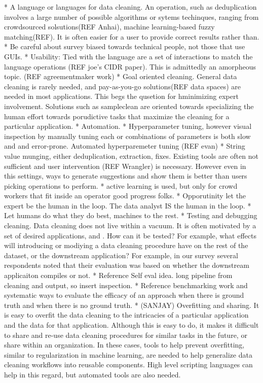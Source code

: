 * A language or languages for data cleaning.  An operation, such as deduplication involves a large number of possible algorithms or sytems techinques, ranging from crowdsourced solsutions(REF Anhai), machine learning-based fuzzy matching(REF).  It is often easier for a user to provide correct results rather than.
* Be careful about survey biased towards technical people, not those that use GUIs. 
* Usability: Tied with the language are a set of interactions to match the language operations (REF joe’s CIDR paper).  This is admittedly an amorpheous topic.  (REF agreementmaker work)
* Goal oriented cleaning.  General data cleaning is rarely needed, and pay-as-you-go solutions(REF data spaces) are needed in most applications.   This begs the qusetion for hminimizing expert involvement.   Solutions such as sampleclean are oriented towards specializing the human effort towards porudictive tasks that maximize the cleaning for a particular application.  
* Automation. 
    * Hyperparameter tuning, however visual inspection by manually tuning each or combinations of parameters is both slow and and error-prone.  Automated hyperparemeter tuning (REF evan)
    * String value munging, either deduplication, extraction, fixes.  Existing tools are often not sufficient and user intervention (REF Wrangler) is necessary.  However even in this settings, ways to generate suggestions and show them is better than users picking operations to perform.
    * active learning is used, but only for crowd workers that fit inside an operator good progress folks.
    * Opporutinity let the expert be the human in the loop.  The data analyst IS the human in the loop.
    * Let humans do what they do best, machines to the rest.
* Testing and debugging cleaning.  Data cleaning does not live within a vacuum.  It is often motivated by a set of desired applications, and .  How can it be tested?  For example, what effects will introducing or modiying a data cleaning procedure have on the rest of the dataset, or the downstream application?  For example, in our survey several respondents noted that their evaluation was based on whether the downstream applicaiton compiles or not.
    * Reference Self eval idea.  long pipeline from cleaning and output, so insert inspection.  
    * Reference benchmarking work and systematic ways to evaluate the efficacy of an approach when there is ground truth and when there is no ground truth.
* (SANJAY) Overfitting and sharing.   It is easy to overfit the data cleaning to the intricacies of a particular application and the data for that application.  Although this is easy to do, it makes it difficult to share and re-use data cleaning procedures for similar tasks in the future, or share within an organization.  In these cases, tools to help prevent overfitting, similar to regularization in machine learning, are needed to help generalize data cleaning workflows into reusable components.  High level scripting languages can help in this regard, but automated tools are also needed.




